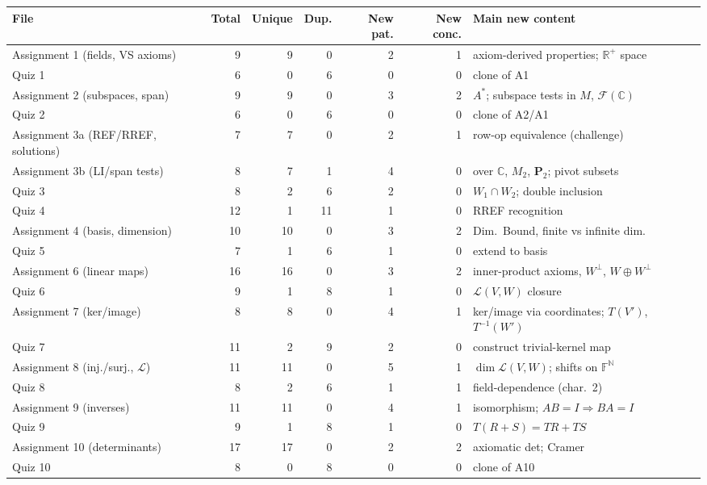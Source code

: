 {\footnotesize
\begin{longtable}{@{}p{4.1cm}rrrrr p{6.3cm}@{}}
\toprule
\textbf{File} & \textbf{Total} & \textbf{Unique} & \textbf{Dup.} & \textbf{New pat.} & \textbf{New conc.} & \textbf{Main new content}\\\midrule\endhead
Assignment 1 (fields, VS axioms) & 9 & 9 & 0 & 2 & 1 & axiom-derived properties; $\mathbb R^+$ space\\
Quiz 1 & 6 & 0 & 6 & 0 & 0 & clone of A1\\
Assignment 2 (subspaces, span) & 9 & 9 & 0 & 3 & 2 & $A^*$; subspace tests in $M$, $\mathcal F(\mathbb C)$\\
Quiz 2 & 6 & 0 & 6 & 0 & 0 & clone of A2/A1\\
Assignment 3a (REF/RREF, solutions) & 7 & 7 & 0 & 2 & 1 & row-op equivalence (challenge)\\
Assignment 3b (LI/span tests) & 8 & 7 & 1 & 4 & 0 & over $\mathbb C$, $M_2$, $\mathbf P_2$; pivot subsets\\
Quiz 3 & 8 & 2 & 6 & 2 & 0 & $W_1\cap W_2$; double inclusion\\
Quiz 4 & 12 & 1 & 11 & 1 & 0 & RREF recognition\\
Assignment 4 (basis, dimension) & 10 & 10 & 0 & 3 & 2 & Dim.\ Bound, finite vs infinite dim.\\
Quiz 5 & 7 & 1 & 6 & 1 & 0 & extend to basis\\
Assignment 6 (linear maps) & 16 & 16 & 0 & 3 & 2 & inner-product axioms, $W^\perp$, $W\oplus W^\perp$\\
Quiz 6 & 9 & 1 & 8 & 1 & 0 & $\mathcal L(V,W)$ closure\\
Assignment 7 (ker/image) & 8 & 8 & 0 & 4 & 1 & ker/image via coordinates; $T(V')$, $T^{-1}(W')$\\
Quiz 7 & 11 & 2 & 9 & 2 & 0 & construct trivial-kernel map\\
Assignment 8 (inj./surj., $\mathcal L$) & 11 & 11 & 0 & 5 & 1 & $\dim\mathcal L(V,W)$; shifts on $\mathbb F^{\mathbb N}$\\
Quiz 8 & 8 & 2 & 6 & 1 & 1 & field-dependence (char.\ 2)\\
Assignment 9 (inverses) & 11 & 11 & 0 & 4 & 1 & isomorphism; $AB{=}I\Rightarrow BA{=}I$\\
Quiz 9 & 9 & 1 & 8 & 1 & 0 & $T(R{+}S)=TR+TS$\\
Assignment 10 (determinants) & 17 & 17 & 0 & 2 & 2 & axiomatic det; Cramer\\
Quiz 10 & 8 & 0 & 8 & 0 & 0 & clone of A10\\

\end{longtable}}
